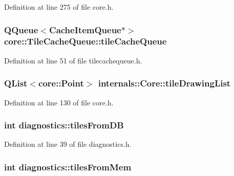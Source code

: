 \-Definition at line 275 of file core.\-h.

\hypertarget{group___o_p_map_widget_ga6bb4a109ac678df86dff7fe8a1a02944}{
\subsubsection[{tile\-Cache\-Queue}]{\setlength{\rightskip}{0pt plus 5cm}\-Q\-Queue$<$\-Cache\-Item\-Queue$\ast$$>$ {\bf core\-::\-Tile\-Cache\-Queue\-::tile\-Cache\-Queue}}}\label{group___o_p_map_widget_ga6bb4a109ac678df86dff7fe8a1a02944}


\-Definition at line 51 of file tilecachequeue.\-h.

\hypertarget{group___o_p_map_widget_gaef8eae2b290cfd062061e8baaebe51d6}{
\subsubsection[{tile\-Drawing\-List}]{\setlength{\rightskip}{0pt plus 5cm}\-Q\-List$<${\bf core\-::\-Point}$>$ {\bf internals\-::\-Core\-::tile\-Drawing\-List}}}\label{group___o_p_map_widget_gaef8eae2b290cfd062061e8baaebe51d6}


\-Definition at line 130 of file core.\-h.

\hypertarget{group___o_p_map_widget_ga1a83442bf140e95b84931d57cc849449}{
\subsubsection[{tiles\-From\-D\-B}]{\setlength{\rightskip}{0pt plus 5cm}int {\bf diagnostics\-::tiles\-From\-D\-B}}}\label{group___o_p_map_widget_ga1a83442bf140e95b84931d57cc849449}


\-Definition at line 39 of file diagnostics.\-h.

\hypertarget{group___o_p_map_widget_gade3ce38dee3744ba9c72ca0dce86b0d4}{
\subsubsection[{tiles\-From\-Mem}]{\setlength{\rightskip}{0pt plus 5cm}int {\bf diagnostics\-::tiles\-From\-Mem}}}\label{group___o_p_map_widget_gade3ce38dee3744ba9c72ca0dce86b0d4}


